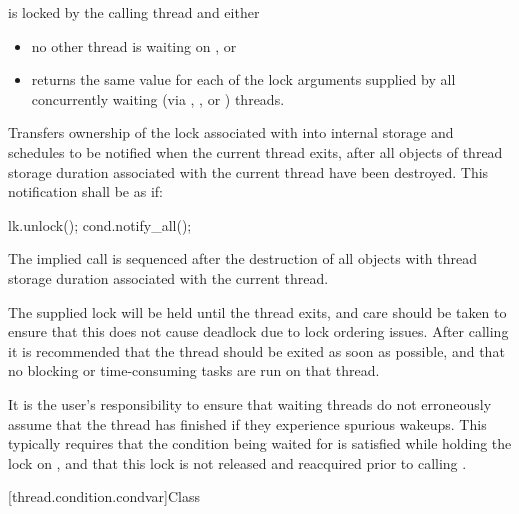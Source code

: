 \begin{itemdescr}
\pnum
\requires {} is locked by the calling thread and either

\begin{itemize}
\item no other thread is waiting on , or
\item {} returns the same value for each of the lock arguments
supplied by all concurrently waiting (via , ,
or ) threads.
\end{itemize}

\pnum
\effects Transfers ownership of the lock associated with  into
internal storage and schedules  to be notified when the current
thread exits, after all objects of thread storage duration associated with
the current thread have been destroyed. This notification shall be as if:
\begin{codeblock}
lk.unlock();
cond.notify_all();
\end{codeblock}

\pnum
\sync The implied  call is sequenced after the destruction of
all objects with thread storage duration associated with the current thread.

\pnum
\begin{note}
The supplied lock will be held until the thread exits, and care
should be taken to ensure that this does not cause deadlock due to lock
ordering issues. After calling  it is
recommended that the thread should be exited as soon as possible, and
that no blocking or time-consuming tasks are run on that thread.
\end{note}

\pnum
\begin{note}
It is the user's responsibility to ensure that waiting threads
do not erroneously assume that the thread has finished if they experience
spurious wakeups. This typically requires that the condition being waited
for is satisfied while holding the lock on , and that this lock
is not released and reacquired prior to calling .
\end{note}
\end{itemdescr}

[thread.condition.condvar]{Class }

